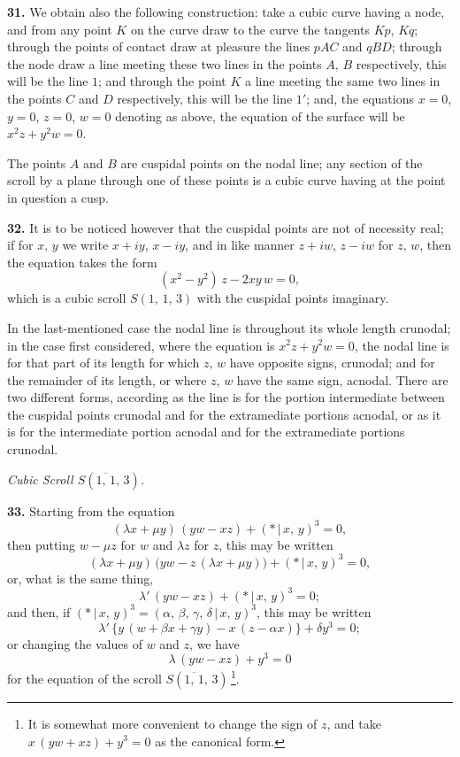 \documentclass[11pt,a4paper]{article}
\providecommand{\mid}{\,|\,}
\begin{document}
\medskip

\textbf{31.} We obtain also the following construction: take a cubic curve having a node, and from any point $K$ on the curve draw to the curve the tangents $Kp$, $Kq$; through the points of contact draw at pleasure the lines $pAC$ and $qBD$; through the node draw a line meeting these two lines in the points $A,\,B$ respectively, this will be the line $1$; and through the point $K$ a line meeting the same two lines in the points $C$ and $D$ respectively, this will be the line $1'$; and, the equations $x = 0$, $y = 0$, $z = 0$, $w = 0$ denoting as above, the equation of the surface will be $x^{2}z + y^{2}w = 0$.

\medskip

The points $A$ and $B$ are cuspidal points on the nodal line; any section of the scroll by a plane through one of these points is a cubic curve having at the point in question a cusp.

\medskip

\textbf{32.} It is to be noticed however that the cuspidal points are not of necessity real; if for $x,\,y$ we write $x + iy$, $x - iy$, and in like manner $z + iw$, $z - iw$ for $z,\,w$, then the equation takes the form
\[
(x^{2} - y^{2})\,z - 2xy\,w = 0,
\]
which is a cubic scroll $S(1,\,1,\,3)$ with the cuspidal points imaginary.

\medskip

In the last-mentioned case the nodal line is throughout its whole length crunodal; in the case first considered, where the equation is $x^{2}z + y^{2}w = 0$, the nodal line is for that part of its length for which $z,\,w$ have opposite signs, crunodal; and for the remainder of its length, or where $z,\,w$ have the same sign, acnodal. There are two different forms, according as the line is for the portion intermediate between the cuspidal points crunodal and for the extramediate portions acnodal, or as it is for the intermediate portion acnodal and for the extramediate portions crunodal.

\bigskip

\begin{center}
\textit{Cubic Scroll $S(\overline{1,\,1},\,3)$.}
\end{center}

\textbf{33.} Starting from the equation
\[
(\lambda x + \mu y)\,(yw - xz) + (*\mid x,\,y)^{3} = 0,
\]
then putting $w - \mu z$ for $w$ and $\lambda z$ for $z$, this may be written
\[
(\lambda x + \mu y)\,\bigl(yw - z\,(\lambda x + \mu y)\bigr) + (*\mid x,\,y)^{3} = 0,
\]
or, what is the same thing,
\[
\lambda'\,(yw - xz) + (*\mid x,\,y)^{3} = 0;
\]
and then, if $(*\mid x,\,y)^{3} = (\alpha,\,\beta,\,\gamma,\,\delta\mid x,\,y)^{3}$, this may be written
\[
\lambda'\,\bigl\{y\,(w + \beta x + \gamma y) - x\,(z - \alpha x)\bigr\} + \delta y^{3} = 0;
\]
or changing the values of $w$ and $z$, we have
\[
\lambda\,(yw - xz) + y^{3} = 0
\]
for the equation of the scroll $S(\overline{1,\,1},\,3)$\,\footnote{It is somewhat more convenient to change the sign of $z$, and take $x\,(yw + xz) + y^{3} = 0$ as the canonical form.}.
\end{document}
